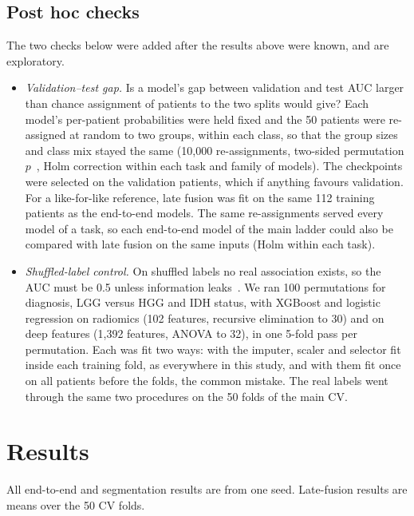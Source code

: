 \documentclass[11pt]{article}
\begin{document}
\subsection{Post hoc checks}
\label{sec:posthoc}
The two checks below were added after the results above were known, and are exploratory.
\begin{itemize}
  \item \emph{Validation--test gap.} Is a model's gap between validation and test AUC larger than chance assignment of
        patients to the two splits would give? Each model's per-patient probabilities were held fixed and the 50
        patients were re-assigned at random to two groups, within each class, so that the group sizes and class mix
        stayed the same (10,000 re-assignments, two-sided permutation $p$~\cite{phipson2010permutation}, Holm
        correction within each task and family of models). The checkpoints were selected on the validation patients,
        which if anything favours validation. For a like-for-like reference, late fusion was fit on the same 112
        training patients as the end-to-end models. The same re-assignments served every model of a task, so each
        end-to-end model of the main ladder could also be compared with late fusion on the same inputs (Holm within
        each task).
  \item \emph{Shuffled-label control.} On shuffled labels no real association exists, so the AUC must be 0.5 unless
        information leaks~\cite{ojala2010permutation}. We ran 100 permutations for diagnosis, LGG versus HGG and IDH
        status, with XGBoost and logistic regression on radiomics (102 features, recursive elimination to 30) and on
        deep features (1,392 features, ANOVA to 32), in one 5-fold pass per permutation. Each was fit two ways: with
        the imputer, scaler and selector fit inside each training fold, as everywhere in this study, and with them fit
        once on all patients before the folds, the common mistake. The real labels went through the same two
        procedures on the 50 folds of the main CV.
\end{itemize}

\section{Results}
All end-to-end and segmentation results are from one seed. Late-fusion results are means over the 50 CV folds.
\end{document}
